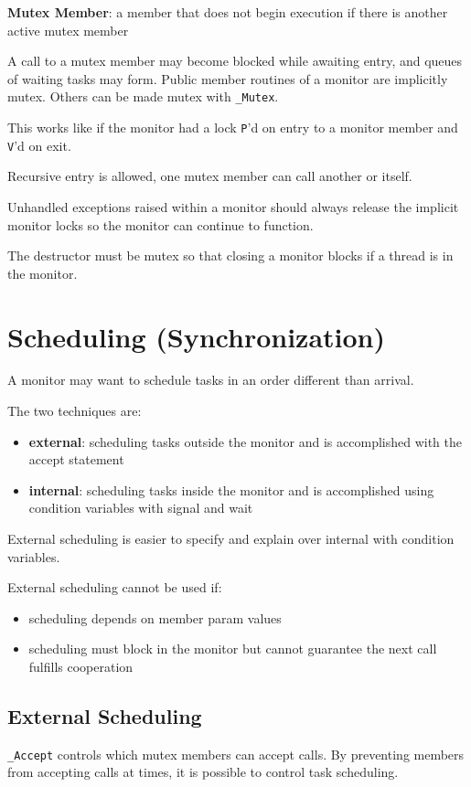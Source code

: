 \documentclass[11pt]{article}
\begin{document}
\textbf{Mutex Member}: a member that does not begin execution if there is another active mutex member

A call to a mutex member may become blocked while awaiting entry, and queues of waiting tasks
may form.
Public member routines of a monitor are implicitly mutex. Others can be made mutex with \texttt{\_Mutex}.

This works like if the monitor had a lock \texttt{P}'d on entry to a monitor member and \texttt{V}'d on exit.

Recursive entry is allowed, one mutex member can call another or itself.

Unhandled exceptions raised within a monitor should always release the implicit monitor locks
so the monitor can continue to function.

The destructor must be mutex so that closing a monitor blocks if a thread is in the monitor.
\section{Scheduling (Synchronization)}
\label{sec:org1591b68}
A monitor may want to schedule tasks in an order different than arrival.

The two techniques are:
\begin{itemize}
\item \textbf{external}: scheduling tasks outside the monitor and is accomplished with the accept
statement
\item \textbf{internal}: scheduling tasks inside the monitor and is accomplished using condition
variables with signal and wait
\end{itemize}

External scheduling is easier to specify and explain over internal with condition variables.

External scheduling cannot be used if:
\begin{itemize}
\item scheduling depends on member param values
\item scheduling must block in the monitor but cannot guarantee the next call fulfills cooperation
\end{itemize}
\subsection{External Scheduling}
\label{sec:orgcd33c94}
\texttt{\_Accept} controls which mutex members can accept calls.
By preventing members from accepting calls at times, it is possible to control task scheduling.
\end{document}
